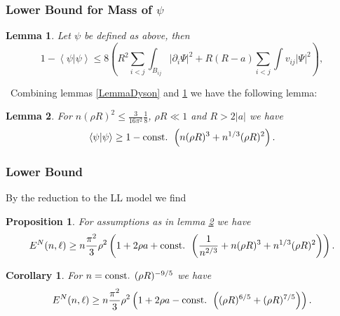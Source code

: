 \documentclass{beamer}[10]
\newcommand{\abs}[1]{\left\lvert #1 \right\rvert}
\renewcommand{\braket}[1]{\left\langle#1\right\rangle}
\newtheorem{mproposition}{Proposition}
\newtheorem{mlemma}{Lemma}
\newtheorem{mcorollary}{Corollary}
\begin{document}
\begin{frame}
	\frametitle{Lower Bound for Mass of $ \psi $}
	\begin{block}{}\vspace{-0.5cm}
			\small\begin{mlemma}\label{LemmaNormLoss}
				Let $ \psi $ be defined as above, then \begin{equation}
				1-\braket{\psi|\psi}\leq 8 \left(R^2\sum_{i<j}\int_{B_{ij}}\abs{\partial_i \Psi}^2+R(R-a)\sum_{i<j}\int v_{ij} \abs{\Psi}^2\right),
				\end{equation}
			\end{mlemma}
			\
			Combining lemmas \ref{LemmaDyson} and \ref{LemmaNormLoss} we have the following lemma:
			\begin{mlemma}\label{LemmaImprovedMassBound}
			 For $ n(\rho R)^2\leq  \frac{3}{16\pi^2}\frac{1}{8} $, $ \rho R\ll 1 $ and $ R>2\abs{a} $ we have
				\begin{equation}\label{EqImprovedMassBound}
				\begin{aligned}
				\braket{\psi|\psi} \geq 1-\textnormal{const. }\left(n(\rho R)^3+n^{1/3}(\rho R)^2\right).
				\end{aligned}
				\end{equation}
			\end{mlemma}
	\end{block}	
\end{frame}

\begin{frame}
	\frametitle{Lower Bound}
	\begin{block}{}
	\small	By the reduction to the LL model we find 
		\begin{mproposition}\label{PropositionLowerBoundSpecN}
			For assumptions as in lemma \ref{LemmaImprovedMassBound} we have \begin{equation}
			E^N(n,\ell)\geq n\frac{\pi^2}{3}\rho^2\left(1+2\rho a+\textnormal{const. }\left(\frac{1}{n^{2/3}}+n(\rho R)^3+n^{1/3}(\rho R)^2\right)\right).
			\end{equation}
		\end{mproposition}
		\begin{mcorollary} \label{CorollaryLowerBoundSpecN}
			For $ n=\textnormal{const. } (\rho R)^{-9/5} $ we have 
			\begin{equation}
			E^N(n,\ell)\geq n\frac{\pi^2}{3}\rho^2\left(1+2\rho a-\textnormal{const. }\left((\rho R)^{6/5}+(\rho R)^{7/5}\right)\right).
			\end{equation}
		\end{mcorollary}
	\end{block}	
\end{frame}
\end{document}
